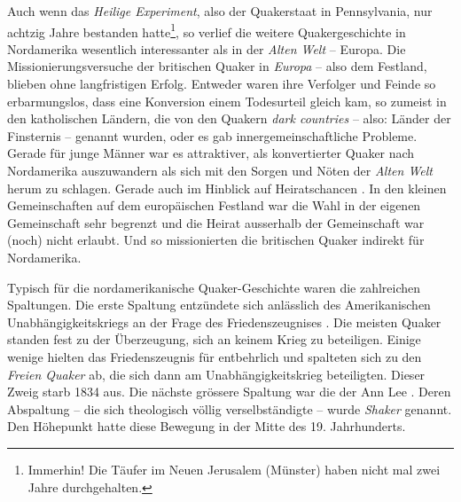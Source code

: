 \medskip

Auch wenn das \textit{Heilige Experiment}, also der Quakerstaat in Pennsylvania,
nur achtzig Jahre
bestanden hatte\footnote{Immerhin! Die Täufer im Neuen Jerusalem (Münster)
  haben
nicht mal zwei Jahre durchgehalten.}, so verlief die weitere
Quakergeschichte in Nordamerika wesentlich interessanter als in der
\textit{Alten
Welt} -- Europa. Die Missionierungsversuche  der britischen
Quaker in
\textit{Europa}  -- also dem Festland, blieben ohne
langfristigen Erfolg.
Entweder waren ihre Verfolger  und Feinde so erbarmungslos,
dass eine
Konversion einem Todesurteil gleich kam, so zumeist in den katholischen
Ländern, die von den Quakern \textit{dark countries}  -- also: Länder der
Finsternis -- genannt wurden, oder es gab innergemeinschaftliche Probleme.
Gerade
für junge Männer war es attraktiver, als konvertierter Quaker nach Nordamerika
auszuwandern als sich mit den Sorgen und Nöten der \textit{Alten Welt} herum
zu
schlagen. Gerade auch im Hinblick auf Heiratschancen . In den
kleinen
Gemeinschaften auf dem europäischen Festland war die Wahl in der eigenen
Gemeinschaft sehr begrenzt und die Heirat ausserhalb der Gemeinschaft war (noch)
nicht erlaubt. Und so missionierten die britischen Quaker indirekt für
Nordamerika.

\medskip

Typisch für die nordamerikanische Quaker-Geschichte waren die zahlreichen
Spaltungen. Die erste Spaltung  entzündete sich anlässlich des
Amerikanischen
Unabhängigkeitskriegs an der Frage des Friedenszeugnises
. Die meisten Quaker
standen fest zu der Überzeugung, sich an keinem Krieg  zu
beteiligen. Einige
wenige hielten das Friedenszeugnis für entbehrlich und spalteten sich zu den
\textit{Freien Quaker}   ab,
die sich dann am Unabhängigkeitskrieg 
beteiligten. Dieser Zweig starb 1834 aus. Die nächste grössere Spaltung war die
der Ann Lee . Deren Abspaltung -- die sich theologisch
völlig verselbständigte --
wurde \textit{Shaker}  genannt. Den Höhepunkt hatte
diese Bewegung in der Mitte
des 19. Jahrhunderts.

\medskip


